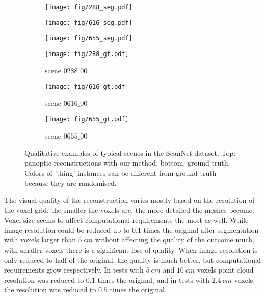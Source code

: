 \begin{figure}[t]
\setlength{\belowcaptionskip}{-10pt}
\centering
\begin{subfigure}[b]{0.32\textwidth}  
        \texttt{[image: fig/288\_seg.pdf]}
\end{subfigure}
\begin{subfigure}[b]{0.32\textwidth}  
        \texttt{[image: fig/616\_seg.pdf]}
\end{subfigure}
\begin{subfigure}[b]{0.32\textwidth}  
        \texttt{[image: fig/655\_seg.pdf]}
\end{subfigure}
\hfill
\begin{subfigure}[b]{0.32\textwidth}  
        \centering 
        \texttt{[image: fig/288\_gt.pdf]}
        \caption[]%
        {\small scene $0288\_00$}
        \label{fig:288}
\end{subfigure}
\begin{subfigure}[b]{0.32\textwidth}  
        \centering 
        \texttt{[image: fig/616\_gt.pdf]}
        \caption[]%
        {\small scene $0616\_00$}    
        \label{fig:616}
\end{subfigure}
\begin{subfigure}[b]{0.32\textwidth}  
        \centering 
        \texttt{[image: fig/655\_gt.pdf]}
        \caption[]%
        {\small scene $0655\_00$}  
        \label{fig:655}
\end{subfigure}
\caption[]%
{Qualitative examples of typical scenes in the ScanNet dataset. Top: panoptic reconstructions with our method, bottom: ground truth. Colors of 'thing' instances can be different from ground truth because they are randomised.}    
\label{fig:examples}
\end{figure}

The visual quality of the reconstruction varies mostly based on the resolution of the voxel grid: the smaller the voxels are, the more detailed the meshes become. Voxel size seems to affect computational requirements the most as well. While image resolution could be reduced up to $0.1$ times the original after segmentation with voxels larger than $5~cm$ without affecting the quality of the outcome much, with smaller voxels there is a significant loss of quality. When image resolution is only reduced to half of the original, the quality is much better, but computational requirements grow respectively. In tests with $5~cm$ and $10~cm$ voxels point cloud resolution was reduced to $0.1$ times the original, and in tests with $2.4~cm$ voxels the resolution was reduced to $0.5$ times the original.

